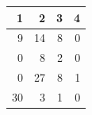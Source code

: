 \begin{tabular}{rrrr}
\toprule
1 & 2 & 3 & 4 \\
\midrule
9 & 14 & 8 & 0 \\
0 & 8 & 2 & 0 \\
0 & 27 & 8 & 1 \\
30 & 3 & 1 & 0 \\
\bottomrule
\end{tabular}
